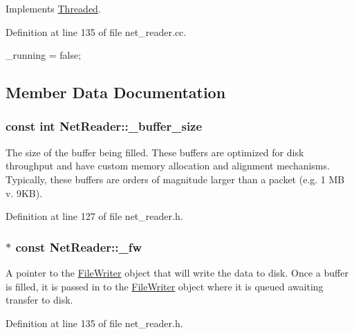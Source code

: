Implements \hyperlink{class_threaded_a421b31c46443970af90b8fa1df8ea141}{Threaded}.



Definition at line 135 of file net\_\-reader.cc.


\begin{DoxyCode}
                            {
  _running = false;
}
\end{DoxyCode}


\subsection{Member Data Documentation}
\hypertarget{class_net_reader_a2ae2988890c04fd26f274d039fb868d8}{
\subsubsection[{\_\-buffer\_\-size}]{\setlength{\rightskip}{0pt plus 5cm}const int {\bf NetReader::\_\-buffer\_\-size}}}
\label{class_net_reader_a2ae2988890c04fd26f274d039fb868d8}
The size of the buffer being filled. These buffers are optimized for disk throughput and have custom memory allocation and alignment mechanisms. Typically, these buffers are orders of magnitude larger than a packet (e.g. 1 MB v. 9KB). 

Definition at line 127 of file net\_\-reader.h.

\hypertarget{class_net_reader_a5c447196aabbe2920be2bad71765ec31}{
\subsubsection[{\_\-fw}]{$\ast$ const {\bf NetReader::\_\-fw}}}
\label{class_net_reader_a5c447196aabbe2920be2bad71765ec31}
A pointer to the \hyperlink{class_file_writer}{FileWriter} object that will write the data to disk. Once a buffer is filled, it is passed in to the \hyperlink{class_file_writer}{FileWriter} object where it is queued awaiting transfer to disk. 

Definition at line 135 of file net\_\-reader.h.

